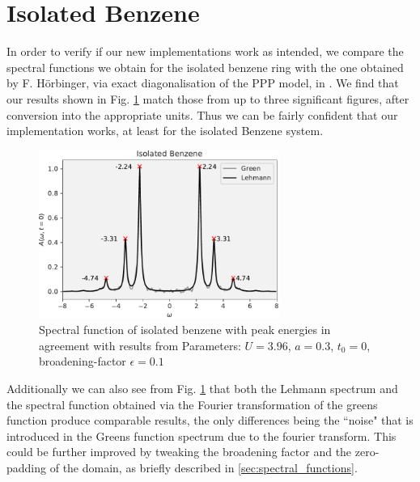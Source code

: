 \section{Isolated Benzene}
    In order to verify if our new implementations work as intended, we compare the spectral functions we obtain for the isolated benzene ring with the one obtained by F. Hörbinger, via exact diagonalisation of the PPP model, in \cite{hoerbinger}. We find that our results shown in Fig. \ref{fig:isolated_benzene} match those from \cite{hoerbinger} up to three significant figures, after conversion into the appropriate units. Thus we can be fairly confident that our implementation works, at least for the isolated Benzene system.

\medskip
\begin{figure}[!hbt]
    \centering
    \includegraphics[width=0.7\textwidth]{graph/isolated_benzene.pdf}
    \caption{Spectral function of isolated benzene with peak energies in agreement with results from \cite{hoerbinger}\newline
    Parameters: $U = 3.96$, $a = 0.3$, $t_0 = 0$, broadening-factor $\epsilon = 0.1 $
    }\label{fig:isolated_benzene}
\end{figure}

Additionally we can also see from Fig. \ref{fig:isolated_benzene} that both the Lehmann spectrum and the spectral function obtained via the Fourier transformation of the greens function produce comparable results, the only differences being the ``noise" that is introduced in the Greens function spectrum due to the fourier transform. This could be further improved by tweaking the broadening factor and the zero-padding of the domain, as briefly described in \ref{sec:spectral_functions}.